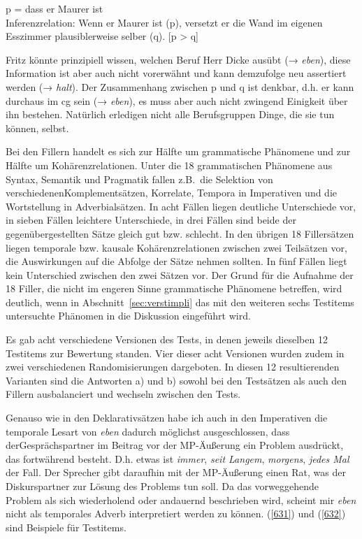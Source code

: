 \begin{exe}
	\ex\label{630} 
	p = dass er Maurer ist\\
	Inferenzrelation: Wenn er Maurer ist (p), versetzt er die Wand im eigenen Esszimmer plausiblerweise selber (q). [p > q]
\end{exe}
Fritz könnte prinzipiell wissen, welchen Beruf Herr Dicke ausübt (→ \textit{eben}), diese Information ist aber auch nicht vorerwähnt und kann demzufolge neu assertiert werden (→ \textit{halt}). Der Zusammenhang zwischen p und q ist denkbar, d.h. er kann durchaus im cg sein (→ \textit{eben}), es muss aber auch nicht zwingend Einigkeit über ihn bestehen. Natürlich erledigen nicht alle Berufsgruppen Dinge, die sie tun können, selbst. 

Bei den Fillern handelt es sich zur Hälfte um grammatische Phänomene und zur Hälfte um  Kohärenzrelationen. Unter die 18 grammatischen Phänomene aus Syntax, Semantik und Pragmatik fallen z.B.\ die Selektion von verschiedenen\linebreak Komplementsätzen, Korrelate, Tempora in Imperativen und die Wortstellung in Adverbialsätzen. In acht Fällen liegen deutliche Unterschiede vor, in sieben Fällen leichtere Unterschiede, in drei Fällen sind beide der gegenübergestellten Sätze gleich gut bzw. schlecht. In den übrigen 18 Fillersätzen liegen temporale bzw. kausale Kohärenzrelationen zwischen zwei Teilsätzen vor, die Auswirkungen auf die Abfolge der Sätze nehmen sollten. In fünf Fällen liegt kein Unterschied zwischen den zwei Sätzen vor. Der Grund für die Aufnahme der 18 Filler, die nicht im engeren Sinne grammatische Phänomene betreffen, wird deutlich, wenn in Abschnitt~\ref{sec:verstimpli} das mit den weiteren sechs Testitems untersuchte Phäno\-men in die Diskussion eingeführt wird.

Es gab acht verschiedene Versionen des Tests, in denen jeweils dieselben 12 Testitems zur Bewertung standen. Vier dieser acht Versionen wurden zudem in zwei verschiedenen Randomisierungen dargeboten. In diesen 12 resultierenden Varianten sind die Antworten a) und b) sowohl bei den Testsätzen als auch den Fillern ausbalanciert und wechseln zwischen den Tests.

Genauso wie in den Deklarativsätzen habe ich auch in den Imperativen die temporale Lesart von \textit{eben} dadurch möglichst ausgeschlossen, dass der\linebreak Gesprächspartner im Beitrag vor der MP-Äußerung ein Problem ausdrückt, das fortwährend besteht. D.h. etwas ist \textit{immer}, \textit{seit Langem}, \textit{morgens}, \textit{jedes Mal} der Fall. Der Sprecher gibt daraufhin mit der MP-Äußerung einen Rat, was der Diskurspartner zur Lösung des Problems tun soll. Da das vorweggehende Problem als sich wiederholend oder andauernd beschrieben wird, scheint mir \textit{eben} nicht als temporales Adverb  interpretiert werden zu können. (\ref{631}) und (\ref{632}) sind Beispiele für Testitems.\largerpage[-1]

